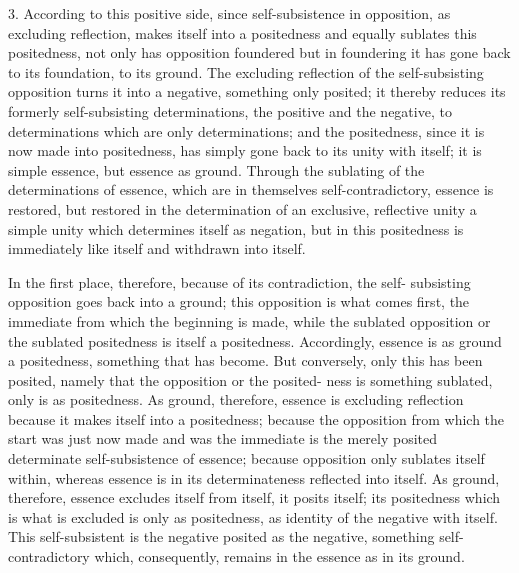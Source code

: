 3. According to this positive side, since self-subsistence in opposition,
as excluding reflection, makes itself into a positedness and equally sublates
this positedness, not only has opposition foundered but in foundering it has
gone back to its foundation, to its ground.  The excluding reflection of the
self-subsisting opposition turns it into a negative, something only posited;
it thereby reduces its formerly self-subsisting determinations, the positive
and the negative, to determinations which are only determinations; and the
positedness, since it is now made into positedness, has simply gone back
to its unity with itself; it is simple essence, but essence as ground. Through
the sublating of the determinations of essence, which are in themselves
self-contradictory, essence is restored, but restored in the determination of
an exclusive, reflective unity  a simple unity which determines itself as
negation, but in this positedness is immediately like itself and withdrawn
into itself.

In the first place, therefore, because of its contradiction, the self-
subsisting opposition goes back into a ground; this opposition is what comes
first, the immediate from which the beginning is made, while the sublated
opposition or the sublated positedness is itself a positedness. Accordingly,
essence is as ground a positedness, something that has become. But conversely,
only this has been posited, namely that the opposition or the posited-
ness is something sublated, only is as positedness. As ground, therefore,
essence is excluding reflection because it makes itself into a positedness;
because the opposition from which the start was just now made and
was the immediate is the merely posited determinate self-subsistence of
essence; because opposition only sublates itself within, whereas essence is
in its determinateness reflected into itself. As ground, therefore, essence
excludes itself from itself, it posits itself; its positedness  which is what
is excluded  is only as positedness, as identity of the negative with
itself. This self-subsistent is the negative posited as the negative, something
self-contradictory which, consequently, remains in the essence as in its
ground.

